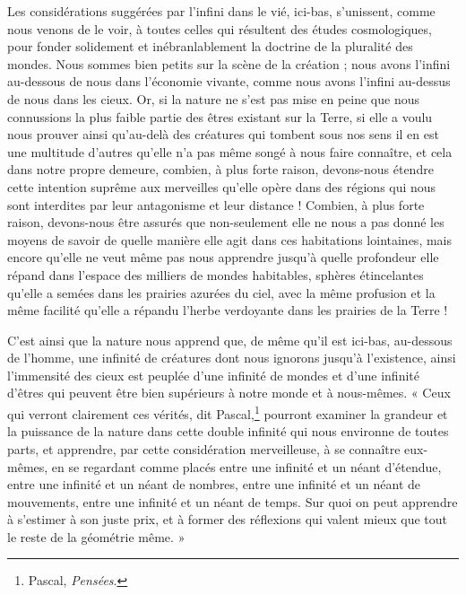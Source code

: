 \documentclass[a4paper, 11pt, oneside, landscape]{article}
\begin{document}
Les considérations suggérées par l'infini dans le vié, ici-bas, s'unissent, comme nous venons de le voir, à toutes celles qui résultent des études cosmologiques, pour fonder solidement et inébranlablement la doctrine de la pluralité des mondes. Nous sommes bien petits sur la scène de la création ; nous avons l'infini au-dessous de nous dans l'économie vivante, comme nous avons l'infini au-dessus de nous dans les cieux. Or, si la nature ne s'est pas mise en peine que nous connussions la plus faible partie des êtres existant sur la Terre, si elle a voulu nous prouver ainsi qu'au-delà des créatures qui tombent sous nos sens il en est une multitude d'autres qu'elle n'a pas même songé à nous faire connaître, et cela dans notre propre demeure, combien, à plus forte raison, devons-nous étendre cette intention suprême aux merveilles qu'elle opère dans des régions qui nous sont interdites par leur antagonisme et leur distance ! Combien, à plus forte raison, devons-nous être assurés que non-seulement elle ne nous a pas donné les moyens de savoir de quelle manière elle agit dans ces habitations lointaines, mais encore qu'elle ne veut même pas nous apprendre jusqu'à quelle profondeur elle répand dans l'espace des milliers de mondes habitables, sphères étincelantes qu'elle a semées dans les prairies azurées du ciel, avec la même profusion et la même facilité qu'elle a répandu l'herbe verdoyante dans les prairies de la Terre !

C'est ainsi que la nature nous apprend que, de même qu'il est ici-bas, au-dessous de l'homme, une infinité de créatures dont nous ignorons jusqu'à l'existence, ainsi l'immensité des cieux est peuplée d'une infinité de mondes et d'une infinité d'êtres qui peuvent être bien supérieurs à notre monde et à nous-mêmes. « Ceux qui verront clairement ces vérités, dit Pascal,\footnote{Pascal, \emph{Pensées}.} pourront examiner la grandeur et la puissance de la nature dans cette double infinité qui nous environne de toutes parts, et apprendre, par cette considération merveilleuse, à se connaître eux-mêmes, en se regardant comme placés entre une infinité et un néant d'étendue, entre une infinité et un néant de nombres, entre une infinité et un néant de mouvements, entre une infinité et un néant de temps. Sur quoi on peut apprendre à s'estimer à son juste prix, et à former des réflexions qui valent mieux que tout le reste de la géométrie même. »
\end{document}
